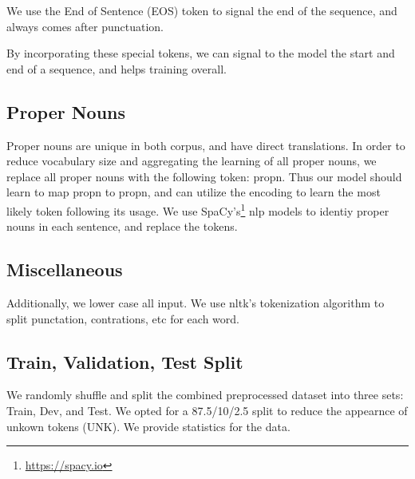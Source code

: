 \documentclass[twoside,twocolumn]{article}
\begin{document}
We use the End of Sentence (EOS) token to signal the end of the sequence, and
always comes after punctuation.

By incorporating these special tokens, we can signal to the model the start and
end of a sequence, and helps training overall.

\subsection{Proper Nouns}
Proper nouns are unique in both corpus, and have direct translations. In order
to reduce vocabulary size and aggregating the learning of all proper nouns,
we replace all proper nouns with the following token: propn. Thus our model
should learn to map propn to propn, and can utilize the encoding to learn the
most likely token following its usage. We use
SpaCy's\footnote{\url{https://spacy.io}} nlp models to identiy
proper nouns in each sentence, and replace the tokens.

\subsection{Miscellaneous}
Additionally, we lower case all input. We use nltk's tokenization algorithm
to split punctation, contrations, etc for each word.

\subsection{Train, Validation, Test Split}
We randomly shuffle and split the combined preprocessed dataset into three sets:
Train, Dev, and Test. We opted for a 87.5/10/2.5 split to reduce the appearnce
of unkown tokens (UNK). We provide statistics for the data.
\end{document}

